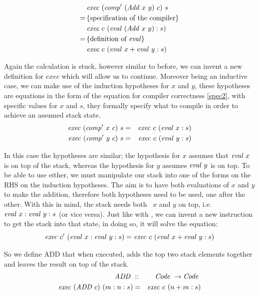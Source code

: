 \documentclass {article}
\begin{document}
\begin{align*}
&\mathit{exec\ } (\mathit{comp'\ }  (\mathit{Add\ } x\ y)\ c)\ s \\
=\, & \{ \mbox{specification of the compiler} \} \\
&\mathit{exec\ } c\ (\mathit{eval\ } (\mathit{Add\ } x\ y) : s) \\
=\, & \{ \mbox{definition of \textit{eval}} \} \\
&\mathit{exec\ } c\ (\mathit{eval\ } x + \mathit{eval\ } y :s)
\end{align*}

Again the calculation is stuck, however similar to before, 
we can invent a new definition for $exec$ which 
will allow us to continue.
Moreover being an inductive case, 
we can make use of the induction 
hypotheses for $x$ and $y$,
these hypotheses are equations in the form
of the equation for compiler correctness \ref{spec2},
with specific values for $x$ and $s$,
they formally specify what to compile in order to achieve
an assumed stack state.
\begin{eqnarray*}
\mathit{exec\ } (\mathit{comp'\ }  x\ c)\ s &=& \mathit{exec\ } c\ (\mathit{eval\ }  x:s) \\
\mathit{exec\ } (\mathit{comp'\ }  y\ c)\ s &=& \mathit{exec\ } c\ (\mathit{eval\ }  y:s) 
\end{eqnarray*}

In this case the hypotheses are similar;
the hypothesis for $x$ assumes that $\mathit{eval\ } x$
is on top of the stack,
whereas the hypothesis for $y$ assumes $\mathit{eval\ } y$
is on top.
To be able to use either, we must manipulate 
our stack into one of the forms on the RHS
on the induction hypotheses.
The aim is to have both evaluations of $x$ and $y$
to make the addition,
therefore both hypotheses need to be used,
one after the other.
With this in mind, 
the stack needs both \eval\ $x$ and $y$ on top, i.e. 
 \( \mathit{eval\ } x : \mathit{eval\ } y : s \)
(or vice versa).
Just like with \val,
we can invent a new instruction
to get the stack into that state,
in doing so, it will solve the equation:
\begin{equation*}
\mathit{exec\ }  c'\ (\mathit{eval\ } x : \mathit{eval\ } y : s) 
	= \mathit{exec\ }  c\ (\mathit{eval\ } x + \mathit{eval\ } y :s)
\end{equation*}

\newcommand{\ADDt}{\textit{ADD}}
\newcommand{\ADD}{\mathit{ADD\ }}

So we define ADD that
when executed, adds the top two stack elements
together and leaves the result on top of the stack.
\begin{eqnarray}
\ADD &::& \Code \rightarrow \Code \nonumber \\
\Exec (\ADD c)\ (m:n:s) &=& \Exec c\ (n+m:s)
\end{eqnarray}
\end{document}
